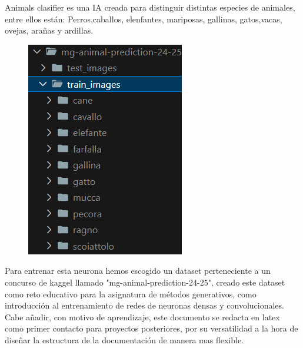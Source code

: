 \documentclass{article}
\begin{document}
    Animals clasifier es una IA creada para distinguir distintas especies de animales, entre ellos están: Perros,caballos, elenfantes, mariposas,
    gallinas, gatos,vacas, ovejas, arañas y ardillas.\\
    \begin{figure}
        \centering
        \includegraphics{dataset_images.png}
    \end{figure}
    Para entrenar esta neurona hemos escogido un dataset perteneciente a un concurso de kaggel llamado "mg-animal-prediction-24-25", creado este dataset
    como reto educativo para la asignatura de métodos generativos, como introducción al entrenamiento de redes de neuronas densas y convolucionales.
    Cabe añadir, con motivo de aprendizaje, este documento se redacta en latex como primer contacto para proyectos posteriores, por su versatilidad
    a la hora de diseñar la estructura de la documentación de manera mas flexible. 
\end{document}
